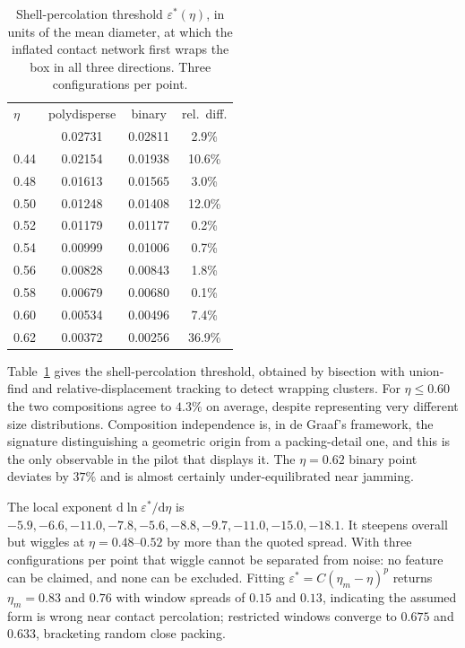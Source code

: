 \documentclass[aps,prl,twocolumn,superscriptaddress,floatfix]{revtex4-2}
\begin{document}
\begin{table}[t]
\caption{Shell-percolation threshold $\varepsilon^*(\eta)$, in units of the mean
diameter, at which the inflated contact network first wraps the box in all three
directions. Three configurations per point.}
\label{tab:perc}
\begin{ruledtabular}
\begin{tabular}{lccc}
$\eta$ & polydisperse & binary & rel.\ diff.\\
\colrule
0.40 & 0.02731 & 0.02811 & 2.9\%\\
0.44 & 0.02154 & 0.01938 & 10.6\%\\
0.48 & 0.01613 & 0.01565 & 3.0\%\\
0.50 & 0.01248 & 0.01408 & 12.0\%\\
0.52 & 0.01179 & 0.01177 & 0.2\%\\
0.54 & 0.00999 & 0.01006 & 0.7\%\\
0.56 & 0.00828 & 0.00843 & 1.8\%\\
0.58 & 0.00679 & 0.00680 & 0.1\%\\
0.60 & 0.00534 & 0.00496 & 7.4\%\\
0.62 & 0.00372 & 0.00256 & 36.9\%\\
\end{tabular}
\end{ruledtabular}
\end{table}

Table~\ref{tab:perc} gives the shell-percolation threshold, obtained by bisection
with union-find and relative-displacement tracking to detect wrapping clusters.
For $\eta\leq0.60$ the two compositions agree to $4.3\%$ on average, despite
representing very different size distributions. Composition independence is, in
de Graaf's framework, the signature distinguishing a geometric origin from a
packing-detail one, and this is the only observable in the pilot that displays
it. The $\eta=0.62$ binary point deviates by $37\%$ and is almost certainly
under-equilibrated near jamming.

The local exponent $\mathrm{d}\ln\varepsilon^*/\mathrm{d}\eta$ is
$-5.9,-6.6,-11.0,-7.8,-5.6,-8.8,-9.7,-11.0,-15.0,-18.1$. It steepens overall but
wiggles at $\eta=0.48$--$0.52$ by more than the quoted spread. With three
configurations per point that wiggle cannot be separated from noise: no feature
can be claimed, and none can be excluded. Fitting
$\varepsilon^*=C(\eta_m-\eta)^p$ returns $\eta_m=0.83$ and $0.76$ with window
spreads of $0.15$ and $0.13$, indicating the assumed form is wrong near contact
percolation; restricted windows converge to $0.675$ and $0.633$, bracketing
random close packing.
\end{document}
